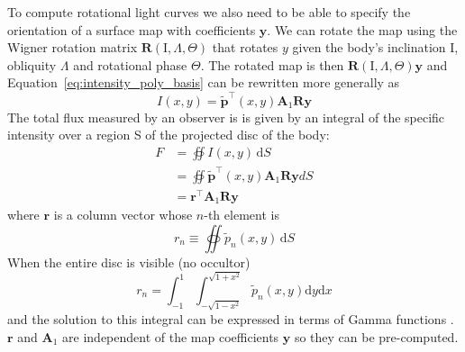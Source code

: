 \documentclass[12pt]{report}
\newcommand{\ud}{\,\mathrm{d}}
\begin{document}
To compute rotational light curves we also need to be able to specify the
orientation of a surface map with coefficients $\mathbf y$. We can rotate the
map using the Wigner rotation matrix $\mathbf{R}(\mathrm{I}, \Lambda, \Theta)$
that rotates $y$ given the body's inclination $\mathrm{I}$, obliquity $\Lambda$
and rotational phase $\Theta$. The rotated map is then $\mathbf{R}(\mathrm{I},
    \Lambda, \Theta) \mathbf{y}$ and Equation~\ref{eq:intensity_poly_basis} can be
rewritten more generally as
\begin{equation}
    I(x, y)=\tilde{\mathbf{p}}^{\top}(x, y) \mathbf{A}_1 \mathbf{R}\mathbf{y}
\end{equation}
The total flux measured by an observer is is given by an integral of the specific
intensity over a region S of the projected disc of the body:
\begin{align}
    F & =\oiint I(x, y) \ud S                                                            \\
      & =\oiint \tilde{\mathbf{p}}^{\top}(x, y) \mathbf{A}_{1} \mathbf{R} \mathbf{y} d S \\
      & =\mathbf{r}^{\top} \mathbf{A}_{1} \mathbf{R} \mathbf{y}
\end{align}
where $\mathbf{r}$ is a column vector whose $n$-th element is \citep{2019AJ....157...64L}
\begin{equation}
    r_{n} \equiv \oiint \tilde{p}_{n}(x, y) \ud S
\end{equation}
When the entire disc is visible (no occultor)
\begin{equation}
    r_{n}=\int_{-1}^{1} \int_{-\sqrt{1-x^{2}}}^{\sqrt{1+x^{2}}} \tilde{p}_{n}(x, y) \mathrm{d}y \mathrm{d} x
\end{equation}
and the solution to this integral can be expressed in terms of Gamma functions
\citep[Equation 20 in ][]{2019AJ....157...64L}.
$\mathbf{r}$ and $\mathbf{A}_1$ are independent of the map coefficients $\mathbf{y}$
so they can be pre-computed.
\end{document}
